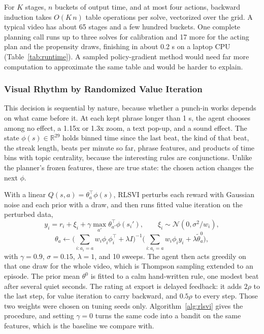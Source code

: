 \documentclass{ieeeaccess}
\begin{document}
For $K$ stages, $n$ buckets of output time, and at most four actions, backward induction takes $O(K\,n)$ table operations per solve, vectorized over the grid. A typical video has about 65 stages and a few hundred buckets. One complete planning call runs up to three solves for calibration and 17 more for the acting plan and the propensity draws, finishing in about 0.2 s on a laptop CPU (Table~\ref{tab:runtime}). A sampled policy-gradient method would need far more computation to approximate the same table and would be harder to explain.

\subsubsection{Visual Rhythm by Randomized Value Iteration}
\label{sec:rhythm}
This decision is sequential by nature, because whether a punch-in works depends on what came before it. At each kept phrase longer than 1 s, the agent chooses among no effect, a 1.15x or 1.3x zoom, a text pop-up, and a sound effect. The state $\phi(s)\in\mathbb{R}^{29}$ holds binned time since the last beat, the kind of that beat, the streak length, beats per minute so far, phrase features, and products of time bins with topic centrality, because the interesting rules are conjunctions. Unlike the planner's frozen features, these are true state: the chosen action changes the next $\phi$.

With a linear $Q(s,a)=\theta_a^{\top}\phi(s)$, RLSVI \cite{osband2016} perturbs each reward with Gaussian noise and each prior with a draw, and then runs fitted value iteration on the perturbed data,
\begin{equation}
y_i = r_i + \xi_i + \gamma \max_{a'} \theta_{a'}^{\top}\phi(s_i'), \qquad \xi_i \sim \mathcal{N}(0,\sigma^{2}/w_i), \label{eq:rlsvi}
\end{equation}
\begin{equation}
\theta_a \leftarrow \Big(\sum_{i:a_i=a} w_i\phi_i\phi_i^{\top} + \lambda I\Big)^{-1}\Big(\sum_{i:a_i=a} w_i\phi_i y_i + \lambda\tilde\theta_a^{0}\Big), \label{eq:rlsvi2}
\end{equation}
with $\gamma=0.9$, $\sigma=0.15$, $\lambda=1$, and 10 sweeps. The agent then acts greedily on that one draw for the whole video, which is Thompson sampling extended to an episode. The prior mean $\theta^{0}$ is fitted to a calm hand-written rule, one modest beat after several quiet seconds. The rating at export is delayed feedback: it adds $2\rho$ to the last step, for value iteration to carry backward, and $0.5\rho$ to every step. Those two weights were chosen on tuning seeds only. Algorithm~\ref{alg:rlsvi} gives the procedure, and setting $\gamma=0$ turns the same code into a bandit on the same features, which is the baseline we compare with.
\end{document}
